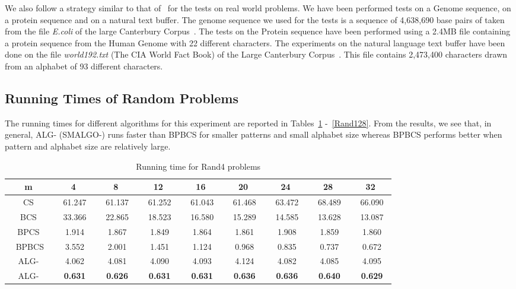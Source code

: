 \documentclass{llncs}
\newcommand{\rom}[1]{\uppercase\expandafter{\romannumeral #1\relax}}
\begin{document}
{We also follow a strategy similar to that of~\cite{CS,CCS} for the tests on real world problems. 
We have been performed tests on a Genome sequence, on a protein sequence and on a natural text buffer. The genome sequence we used for the tests is a sequence of 4,638,690 base pairs of  taken from the file \emph{E.coli} of the large Canterbury Corpus~\cite{corpus}.
The tests on the Protein sequence have been performed using a 2.4MB file containing a protein sequence from the Human Genome with 22 different characters. The experiments on the natural language text buffer have been done on the file \emph{world192.txt} (The CIA World Fact Book) of the Large Canterbury Corpus~\cite{corpus}. This file contains 2,473,400 characters drawn from an alphabet of 93 different characters.


\subsection{Running Times of Random Problems}

The running times for different algorithms for this experiment are reported in Tables~\ref{Rand4} -~\ref{Rand128}. From the results, we see that, in general, ALG-\rom{1} (SMALGO-\rom{1}) runs faster than BPBCS for smaller patterns and small alphabet size whereas BPBCS performs better when pattern and alphabet size are relatively large.




\begin{table}
\begin{center}
\begin{tabular}{|c|c|c|c|c|c|c|c|c|}
\hline
m&4&8&12&16&20&24&28&32\\
\hline
CS &~ 61.247~ &~ 61.137~ &~ 61.252~ &~ 61.043~ &~ 61.468~ &~ 63.472~ &~ 68.489~ &~ 66.090~ \\
\hline
BCS &~ 33.366~ &~ 22.865~ &~ 18.523~ &~ 16.580~ &~ 15.289~ &~ 14.585~ &~ 13.628~ &~ 13.087~ \\
\hline
BPCS &~ 1.914~ &~ 1.867~ &~ 1.849~ &~ 1.864~ &~ 1.861~ &~ 1.908~ &~ 1.859~ &~ 1.860~ \\
\hline
~ BPBCS~ &~ 3.552~ &~ 2.001~ &~ 1.451~ &~ 1.124~ &~ 0.968~ &~ 0.835~ &~ 0.737~ &~ 0.672~ \\
\hline 
ALG-\rom{2} &~ 4.062~ &~ 4.081~ &~ 4.090~ &~ 4.093~ &~ 4.124~ &~ 4.082~ &~ 4.085~ &~ 4.095~ \\
\hline
ALG-\rom{1} &~ \textbf{0.631}~ &~ \textbf{0.626}~ &~ \textbf{0.631}~ &~ \textbf{0.631}~ &~ \textbf{0.636}~ &~ \textbf{0.636}~ &~ \textbf{0.640}~ &~ \textbf{0.629}~ \\
\hline
\end{tabular}
\caption{Running time for Rand4 problems}
\label{Rand4}
\end{center}
\end{table}

}
\end{document}
